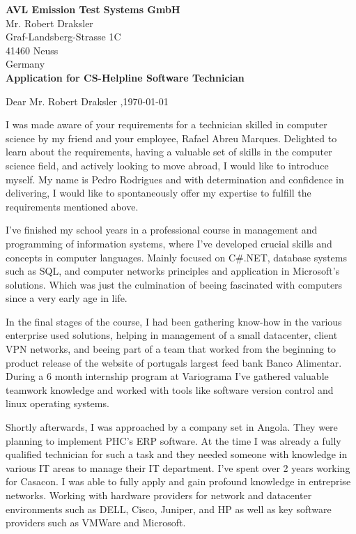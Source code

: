 \documentclass{letter}
\renewcommand*{\opening}[1]{\vspace{2\parskip}%
#1 \toname,\hfill\today\par\nobreak
}
\begin{document}
\begin{letter}{}

\textbf{AVL Emission Test Systems GmbH}\\
Mr. Robert Draksler\\
Graf-Landsberg-Strasse 1C\\
41460 Neuss\\
Germany\\

\textbf{Application for CS-Helpline Software Technician}

\opening{Dear Mr. Robert Draksler}


I was made aware of your requirements for a technician skilled in computer science by my friend and
your employee, Rafael Abreu Marques. Delighted to learn about the requirements, having a valuable
set of skills in the computer science field, and actively looking to move abroad, I would like to
introduce myself. My name is Pedro Rodrigues and with determination and confidence in delivering, I
would like to spontaneously offer my expertise to fulfill the requirements mentioned above.

I've finished my school years in a professional course in management and programming of information
systems, where I've developed crucial skills and concepts in computer languages. Mainly focused on
C\#.NET, database systems such as SQL, and computer networks principles and application in
Microsoft's solutions. Which was just the culmination of beeing fascinated with computers since a
very early age in life.

In the final stages of the course, I had been gathering know-how in the various enterprise used
solutions, helping in management of a small datacenter, client VPN networks, and beeing part of a
team that worked from the beginning to product release of the website of portugals largest feed
bank Banco Alimentar. During a 6 month internship program at Variograma I've gathered valuable
teamwork knowledge and worked with tools like software version control and linux operating systems.

Shortly afterwards, I was approached by a company set in Angola. They were planning to implement
PHC's ERP software. At the time I was already a fully qualified technician for such a task and they
needed someone with knowledge in various IT areas to manage their IT department. I've spent over 2
years working for Casacon. I was able to fully apply and gain profound knowledge in entreprise
networks. Working with hardware providers for network and datacenter environments such as DELL,
Cisco, Juniper, and HP as well as key software providers such as VMWare and Microsoft.


\end{letter}
\end{document}
